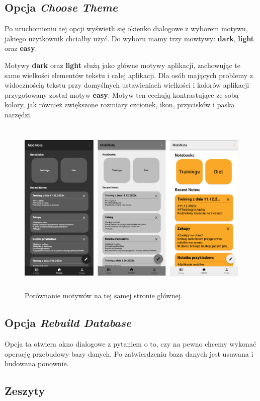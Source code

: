 \subsection{Opcja \textit{Choose Theme}}

Po uruchomieniu tej opcji wyświetli się okienko dialogowe z wyborem motywu, jakiego użytkownik chciałby użyć. Do wyboru mamy trzy mowtywy: \textbf{dark}, \textbf{light} oraz \textbf{easy}.

Motywy \textbf{dark} oraz \textbf{light} służą jako główne motywy aplikacji, zachowując te same wielkości elementów tekstu i całej aplikacji.
Dla osób mających problemy z widocznością tekstu przy domyślnych ustawieniach wielkości i kolorów aplikacji przygotowany został motyw \textbf{easy}.
Motyw ten cechują kontrastujące ze sobą kolory, jak również zwiększone rozmiary czcionek, ikon, przycisków i paska narzędzi.

\begin{figure}[ht]
    \centering
    \includegraphics[height=8.5cm]{images/strona_domowa_motywy.png}
    \caption{Porównanie motywów na tej samej stronie głównej.}
    \label{fig:mainPage}
\end{figure}

\subsection{Opcja \textit{Rebuild Database}}

Opcja ta otwiera okno dialogowe z pytaniem o to, czy na pewno chcemy wykonać operację przebudowy bazy danych. Po zatwierdzeniu baza danych jest usuwana i budowana ponownie.

\subsection{Zeszyty}

